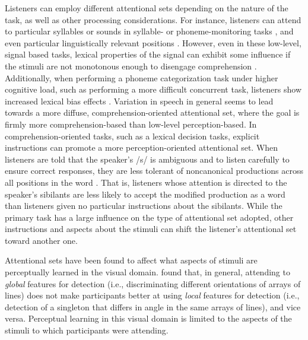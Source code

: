 Listeners can employ different attentional sets depending on the nature of the task, as well as other processing considerations.
For instance, listeners can attend to particular syllables or sounds in syllable- or phoneme-monitoring tasks \citep[and others]{Norris1988}, and even particular linguistically relevant positions \citep{Pitt1990}.
However, even in these low-level, signal based tasks, lexical properties of the signal can exhibit some influence if the stimuli are not monotonous enough to disengage comprehension \citep{Cutler1987}.  
Additionally, when performing a phoneme categorization task under higher cognitive load, such as performing a more difficult concurrent task, listeners show increased lexical bias effects \citep{Mattys2011}.
Variation in speech in general seems to lead towards a more diffuse, comprehension-oriented attentional set, where the goal is firmly more comprehension-based than low-level perception-based.
In comprehension-oriented tasks, such as a lexical decision tasks, explicit instructions can promote a more perception-oriented attentional set.
When listeners are told that the speaker's /s/ is ambiguous and to listen carefully to ensure correct responses, they are less tolerant of noncanonical productions across all positions in the word \citep{Pitt2012}.  
That is, listeners whose attention is directed to the speaker's sibilants are less likely to accept the modified production as a word than listeners given no particular instructions about the sibilants.
While the primary task has a large influence on the type of attentional set adopted, other instructions and aspects about the stimuli can shift the listener's attentional set toward another one.

Attentional sets have been found to affect what aspects of stimuli are perceptually learned in the visual domain.
\citet{Ahissar1993} found that, in general, attending to \emph{global} features for detection (i.e., discriminating different orientations of arrays of lines) does not make participants better at using \emph{local} features for detection (i.e., detection of a singleton that differs in angle in the same arrays of lines), and vice versa.  
Perceptual learning in this visual domain is limited to the aspects of the stimuli to which participants were attending.  


